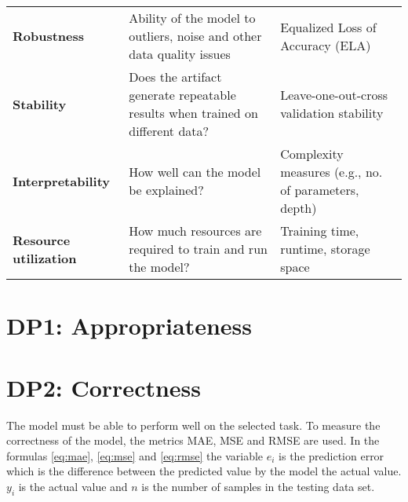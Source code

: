 \begin{table}[H]
\begin{tcolorbox}[arc=0pt,boxrule=0.5pt]
{\begin{tabular}{p{2.5cm}p{6cm}p{3cm}}
                \hdashline
                \textbf{Robustness}           & Ability of the model to outliers, noise and other data quality issues                                           & Equalized Loss of Accuracy (ELA)                     \\

                \hdashline
                \textbf{Stability}            & Does the artifact generate repeatable results when trained on different data?                                   & Leave-one-out-cross validation stability             \\

                \hdashline
                \textbf{Interpretability}     & How well can the model be explained?                                                                            & Complexity measures (e.g., no. of parameters, depth) \\

                \hdashline
                \textbf{Resource utilization} & How much resources are required to train and run the model?                                                     & Training time, runtime, storage space                \\
                \bottomrule
            \end{tabular}
        } %
    \end{tcolorbox}
\end{table}

\section{DP1: Appropriateness}


\section{DP2: Correctness}
The model must be able to perform well on the selected task.
To measure the correctness of the model, the metrics MAE, MSE and RMSE are used.
In the formulas \ref{eq:mae}, \ref{eq:mse} and \ref{eq:rmse} the variable $e_i$ is the prediction error which is the difference between the predicted value by the model the actual value.
$y_i$ is the actual value and $n$ is the number of samples in the testing data set.

